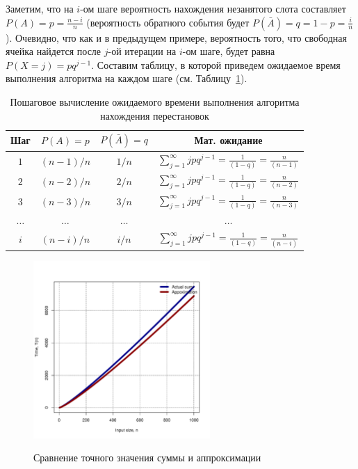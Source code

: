 Заметим, что на $i$-ом шаге вероятность нахождения незанятого слота составляет 
$P(A) = p = \frac{n-i}{n}$ (вероятность обратного события будет 
$P(\bar{A}) = q = 1 - p =\frac{i}{n}$). Очевидно, что как и в предыдущем примере, 
вероятность того, что свободная ячейка найдется после $j$-ой итерации на $i$-ом 
шаге, будет равна $P(X=j)=pq^{j-1}$. Составим таблицу, в которой приведем 
ожидаемое время выполнения алгоритма на каждом шаге (см. Таблицу~\ref{tab:permutations}).

\begin{table}
\centering
\begin{tabular}{|c|c|c|c|}
\hline
Шаг & $P(A) = p$ & $P(\bar{A}) = q$ & Мат. ожидание  \\\hline
$1$ &  $(n-1)/n$      & $1/n$           & $\sum_{j=1}^{\infty} jpq^{j-1} = \frac{1}{(1-q)} = \frac{n}{(n-1)} $ \\\hline
$2$ &  $(n-2)/n$      & $2/n$           & $\sum_{j=1}^{\infty} jpq^{j-1} = \frac{1}{(1-q)} = \frac{n}{(n-2)} $ \\\hline
$3$ &  $(n-3)/n$      & $3/n$           & $\sum_{j=1}^{\infty} jpq^{j-1} = \frac{1}{(1-q)} = \frac{n}{(n-3)} $ \\\hline
$\ldots$ & $\ldots$   & $\ldots$        & $\ldots$ \\\hline
$i$ &  $(n-i)/n$      & $i/n$           & $\sum_{j=1}^{\infty} jpq^{j-1} = \frac{1}{(1-q)} = \frac{n}{(n-i)} $ \\\hline
\end{tabular}
\label{tab:permutations}
\caption{Пошаговое вычисление ожидаемого времени выполнения алгоритма нахождения перестановок}
\end{table}

\begin{figure}[ht!]
\centering
\includegraphics[width=0.6\textwidth]{graphics/approximation.pdf}
\label{fig:approximation}
\caption{Сравнение точного значения суммы и аппроксимации}
\end{figure}


